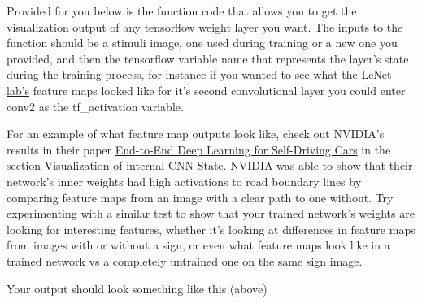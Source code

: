 \documentclass[11pt]{article}
\begin{document}
Provided for you below is the function code that allows you to get the
visualization output of any tensorflow weight layer you want. The inputs
to the function should be a stimuli image, one used during training or a
new one you provided, and then the tensorflow variable name that
represents the layer's state during the training process, for instance
if you wanted to see what the
\href{https://classroom.udacity.com/nanodegrees/nd013/parts/fbf77062-5703-404e-b60c-95b78b2f3f9e/modules/6df7ae49-c61c-4bb2-a23e-6527e69209ec/lessons/601ae704-1035-4287-8b11-e2c2716217ad/concepts/d4aca031-508f-4e0b-b493-e7b706120f81}{LeNet
lab's} feature maps looked like for it's second convolutional layer you
could enter conv2 as the tf\_activation variable.

For an example of what feature map outputs look like, check out NVIDIA's
results in their paper
\href{https://devblogs.nvidia.com/parallelforall/deep-learning-self-driving-cars/}{End-to-End
Deep Learning for Self-Driving Cars} in the section Visualization of
internal CNN State. NVIDIA was able to show that their network's inner
weights had high activations to road boundary lines by comparing feature
maps from an image with a clear path to one without. Try experimenting
with a similar test to show that your trained network's weights are
looking for interesting features, whether it's looking at differences in
feature maps from images with or without a sign, or even what feature
maps look like in a trained network vs a completely untrained one on the
same sign image.

Your output should look something like this (above)
\end{document}
